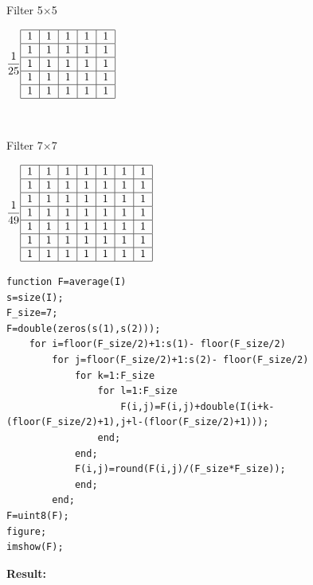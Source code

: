 \begin{center}
		Filter 5$\times$5
	
	$\dfrac{1}{25}\begin{tabular}{|c|c|c|c|c|}
		\hline 
		1 & 1 & 1 & 1 & 1 \\ 
		\hline 
		1 & 1 & 1 & 1 & 1 \\ 
		\hline 
		1 & 1 & 1 & 1 & 1 \\ 
		\hline 
		1 & 1 & 1 & 1 & 1 \\ 
		\hline 
		1 & 1 & 1 & 1 & 1 \\ 
		\hline 
	\end{tabular} $
\end{center}

\

\begin{center}
	Filter 7$\times$7

$\dfrac{1}{49}\begin{tabular}{|c|c|c|c|c|c|c|}
	\hline 
	1 & 1 & 1 & 1 & 1 & 1 & 1 \\ 
	\hline 
	1 & 1 & 1 & 1 & 1 & 1 & 1 \\ 
	\hline 
	1 & 1 & 1 & 1 & 1 & 1 & 1 \\ 
	\hline 
	1 & 1 & 1 & 1 & 1 & 1 & 1 \\ 
	\hline 
	1 & 1 & 1 & 1 & 1 & 1 & 1 \\ 
	\hline 
	1 & 1 & 1 & 1 & 1 & 1 & 1 \\ 
	\hline 
	1 & 1 & 1 & 1 & 1 & 1 & 1 \\ 
	\hline 
\end{tabular} $
\end{center}
\vspace{1cm}


\begin{lstlisting}
function F=average(I)
s=size(I);
F_size=7;
F=double(zeros(s(1),s(2)));
	for i=floor(F_size/2)+1:s(1)- floor(F_size/2)
		for j=floor(F_size/2)+1:s(2)- floor(F_size/2)
			for k=1:F_size
				for l=1:F_size
					F(i,j)=F(i,j)+double(I(i+k-(floor(F_size/2)+1),j+l-(floor(F_size/2)+1)));
				end;
			end;
			F(i,j)=round(F(i,j)/(F_size*F_size));
			end;
		end;
F=uint8(F);
figure;
imshow(F);
\end{lstlisting}



\textbf{Result:}

